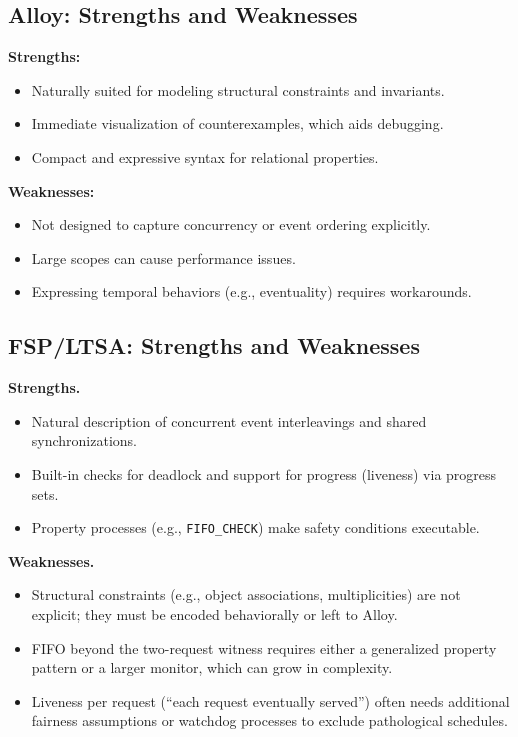 \documentclass[11pt]{article}
\begin{document}
\subsection{Alloy: Strengths and Weaknesses}

\textbf{Strengths:}
\begin{itemize}[leftmargin=1.5em]
  \item Naturally suited for modeling structural constraints and invariants.
  \item Immediate visualization of counterexamples, which aids debugging.
  \item Compact and expressive syntax for relational properties.
\end{itemize}
\textbf{Weaknesses:}
\begin{itemize}[leftmargin=1.5em]
  \item Not designed to capture concurrency or event ordering explicitly.
  \item Large scopes can cause performance issues.
  \item Expressing temporal behaviors (e.g., eventuality) requires workarounds.
\end{itemize}

\subsection{FSP/LTSA: Strengths and Weaknesses}

\textbf{Strengths.}
\begin{itemize}[leftmargin=1.5em]
  \item Natural description of concurrent event interleavings and shared synchronizations.
  \item Built-in checks for deadlock and support for progress (liveness) via progress sets.
  \item Property processes (e.g., \texttt{FIFO\_CHECK}) make safety conditions executable.
\end{itemize}

\textbf{Weaknesses.}
\begin{itemize}[leftmargin=1.5em]
  \item Structural constraints (e.g., object associations, multiplicities) are not explicit; they must be encoded behaviorally or left to Alloy.
  \item FIFO beyond the two-request witness requires either a generalized property pattern or a larger monitor, which can grow in complexity.
  \item Liveness per request (``each request eventually served'') often needs additional fairness assumptions or watchdog processes to exclude pathological schedules.
\end{itemize}
\end{document}
